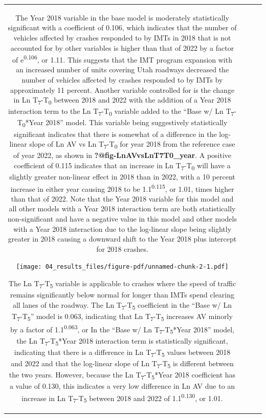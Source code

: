 \documentclass[
  letterpaper,
  authoryear]{elsarticle}
\begin{document}
\begin{table}
{\begin{tabular}[t]{c|c|c|c}
\begin{table}
The Year 2018 variable in the base model is moderately statistically
significant with a coefficient of 0.106, which indicates that the number
of vehicles affected by crashes responded to by IMTs in 2018 that is not
accounted for by other variables is higher than that of 2022 by a factor
of e\textsuperscript{0.106}, or 1.11. This suggests that the IMT program
expansion with an increased number of units covering Utah roadways
decreased the number of vehicles affected by crashes responded to by
IMTs by approximately 11 percent. Another variable controlled for is the
change in Ln T\textsubscript{7}-T\textsubscript{0} between 2018 and 2022
with the addition of a Year 2018 interaction term to the Ln
T\textsubscript{7}-T\textsubscript{0} variable added to the ``Base w/ Ln
T\textsubscript{7}-T\textsubscript{0}*Year 2018'' model. This variable
being suggestively statistically significant indicates that there is
somewhat of a difference in the log-linear slope of Ln AV vs Ln
T\textsubscript{7}-T\textsubscript{0} for year 2018 from the reference
case of year 2022, as shown in \textbf{?@fig-LnAVvsLnT7T0\_year}. A
positive coefficient of 0.115 indicates that an increase in Ln
T\textsubscript{7}-T\textsubscript{0} will have a slightly greater
non-linear effect in 2018 than in 2022, with a 10 percent increase in
either year causing 2018 to be 1.1\textsuperscript{0.115}, or 1.01,
times higher than that of 2022. Note that the Year 2018 variable for
this model and all other models with a Year 2018 interaction term are
both statistically non-significant and have a negative value in this
model and other models with a Year 2018 interaction due to the
log-linear slope being slightly greater in 2018 causing a downward shift
to the Year 2018 plus intercept for 2018 crashes.

\texttt{[image: 04\_results\_files/figure-pdf/unnamed-chunk-2-1.pdf]}

The Ln T\textsubscript{7}-T\textsubscript{5} variable is applicable to
crashes where the speed of traffic remains significantly below normal
for longer than IMTs spend clearing all lanes of the roadway. The Ln
T\textsubscript{7}-T\textsubscript{5} coefficient in the ``Base w/ Ln
T\textsubscript{7}-T\textsubscript{5}'' model is 0.063, indicating that
Ln T\textsubscript{7}-T\textsubscript{5} increases AV minorly by a
factor of 1.1\textsuperscript{0.063}, or In the ``Base w/ Ln
T\textsubscript{7}-T\textsubscript{5}*Year 2018'' model, the Ln
T\textsubscript{7}-T\textsubscript{5}*Year 2018 interaction term is
statistically significant, indicating that there is a difference in Ln
T\textsubscript{7}-T\textsubscript{5} values between 2018 and 2022 and
that the log-linear slope of Ln T\textsubscript{7}-T\textsubscript{5} is
different between the two years. However, because the Ln
T\textsubscript{7}-T\textsubscript{5}*Year 2018 coefficient has a value
of 0.130, this indicates a very low difference in Ln AV due to an
increase in Ln T\textsubscript{7}-T\textsubscript{5} between 2018 and
2022 of 1.1\textsuperscript{0.130}, or 1.01.


\end{table}
\end{tabular}}
\end{table}
\end{document}
